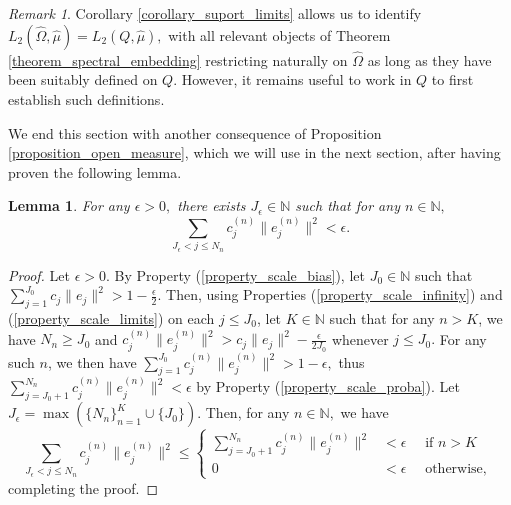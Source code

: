 \documentclass{amsart}
\newtheorem{lemma}[thm]{Lemma}
\theoremstyle{definition}
\theoremstyle{remark}
\newtheorem{remark}[thm]{Remark}
\def \HOM{\hat{\Omega}}
\def \HMU{\hat{\mu}}
\begin{document}
\begin{remark}
	Corollary \ref{corollary_suport_limits} allows us to identify $L_2(\HOM,\HMU)=L_2(Q,\HMU),$ with all relevant objects of Theorem \ref{theorem_spectral_embedding} restricting naturally on $\HOM$ as long as they have been suitably defined on $Q$. However, it remains useful to work in $Q$ to first establish such definitions.
\end{remark}

We end this section with another consequence of Proposition \ref{proposition_open_measure}, which we will use in the next section, after having proven the following lemma. 

\begin{lemma}\label{lemma_uniform_series}
	For any $\epsilon>0,$ there exists $J_{\epsilon}\in\mathbb{N}$ such that for any $n\in\mathbb{N},$ $$\sum_{J_{\epsilon}<j\leq N_n}c_j^{(n)}\|e_j^{(n)}\|^2<\epsilon.$$
\end{lemma}
\begin{proof}
	Let $\epsilon>0.$ By Property (\ref{property_scale_bias}), let $J_0\in\mathbb{N}$ such that $\sum_{j=1}^{J_0}c_j\|e_j\|^2>1-\frac{\epsilon}{2}.$ Then, using Properties (\ref{property_scale_infinity}) and  (\ref{property_scale_limits}) on each $j\leq J_0$, let $K\in\mathbb{N}$ such that for any $n>K$, we have $N_n\geq J_0$ and  $c_j^{(n)}\|e_j^{(n)}\|^2>c_j\|e_j\|^2-\frac{\epsilon}{2J_0}$ whenever $j\leq J_0.$ For any such $n$, we then have $\sum_{j=1}^{J_0} c_j^{(n)}\|e_j^{(n)}\|^2>1-\epsilon,$ thus $\sum_{j=J_0+1}^{N_n}c_j^{(n)}\|e_j^{(n)}\|^2<\epsilon$ by Property (\ref{property_scale_proba}). Let $J_{\epsilon}=\max(\{N_n\}_{n=1}^K\cup \{J_0\}).$ Then, for any $n\in\mathbb{N},$ we have $$\sum_{J_{\epsilon}<j\leq N_n}c_j^{(n)}\|e_j^{(n)}\|^2\leq\begin{cases}
		\sum_{j=J_0+1}^{N_n}c_j^{(n)}\|e_j^{(n)}\|^2&<\epsilon\quad \text{ if $n>K$ }	\\
		0&<\epsilon\quad \text{ otherwise, }
		\end{cases}$$ completing the proof.
\end{proof}
\end{document}
